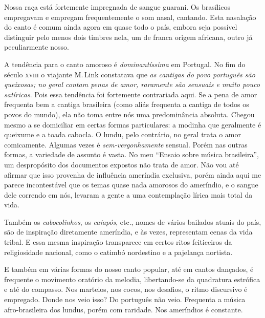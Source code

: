 Nossa raça está fortemente impregnada de sangue guarani. Os brasílicos
empregavam e empregam frequentemente o som nasal, cantando. Esta
nasalação do canto é comum ainda agora em quase todo o país, embora seja
possível distinguir pelo menos dois timbres nela, um de franca origem
africana, outro já peculiarmente nosso.

A tendência para o canto amoroso é \textit{dominantíssima} em Portugal. No fim do
século \textsc{xviii} o viajante M.\,Link constatava que \textit{as cantigas do povo
português são queixosas; no geral contam penas de amor, raramente são
sensuais e muito pouco satíricas}. Pois essa tendência foi fortemente
contrariada aqui. Se a pena de amor frequenta bem a cantiga brasileira
(como aliás frequenta a cantiga de todos os povos do mundo), ela não
toma entre nós uma predominância absoluta. Chegou mesmo a se domiciliar
em certas formas particulares: a modinha que geralmente é queixume e a
toada cabocla. O lundu, pelo contrário, no geral trata o amor
comicamente. Algumas vezes é \textit{sem-vergonhamente} sensual. Porém nas outras
formas, a variedade de assunto é vasta. No meu ``Ensaio sobre música
brasileira'', um despropósito dos documentos expostos não trata de amor.
Não vou até afirmar que isso provenha de influência ameríndia exclusiva,
porém ainda aqui me parece incontestável que os temas quase nada amorosos
do ameríndio, e o sangue dele correndo em nós, levaram a gente a uma
contemplação lírica mais total da vida.

Também os \textit{cabocolinhos}, os \textit{caiapós}, etc., nomes de vários
bailados atuais do país, são de inspiração diretamente ameríndia, e às
vezes, representam cenas da vida tribal. E essa mesma inspiração
transparece em certos ritos feiticeiros da religiosidade nacional, como
o catimbó nordestino e a pajelança nortista.

E também em várias formas do nosso canto popular, até em cantos
dançados, é frequente o movimento oratório da melodia, libertando-se da
quadratura estrófica e até do compasso. Nos martelos, nos cocos, nos
desafios, o ritmo discursivo é empregado. Donde nos veio isso? Do
português não veio. Frequenta a música afro-brasileira dos lundus, porém
com raridade. Nos ameríndios é constante.

